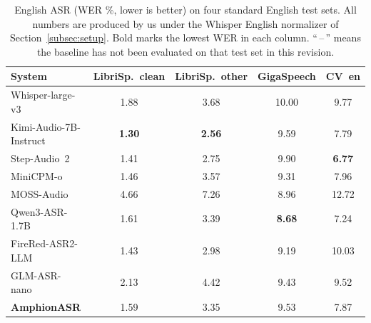 \begin{table}[t]
  \caption{English ASR (WER \%, lower is better) on four standard
    English test sets. All numbers are produced by us under the
    Whisper English normalizer of Section~\ref{subsec:setup}. Bold
    marks the lowest WER in each column. ``\,--\,'' means the
    baseline has not been evaluated on that test set in this
    revision.}
  \label{tab:asr_en}
  \centering
  \small
  \begin{tabular}{lcccc}
    \toprule
    System & LibriSp.~clean & LibriSp.~other & GigaSpeech & CV~en \\
    \midrule
    Whisper-large-v3~\cite{radford2023whisper} & 1.88 & 3.68 & 10.00 & 9.77 \\
    Kimi-Audio-7B-Instruct~\cite{kimiaudio2025} & \textbf{1.30} & \textbf{2.56} & 9.59 & 7.79 \\
    Step-Audio~2~\cite{stepaudio22025} & 1.41 & 2.75 & 9.90 & \textbf{6.77} \\
    MiniCPM-o~\cite{minicpm2025} & 1.46 & 3.57 & 9.31 & 7.96 \\
    MOSS-Audio~\cite{moss2026audio} & 4.66 & 7.26 & 8.96 & 12.72 \\
    Qwen3-ASR-1.7B~\cite{qwen2025qwen3asr} & 1.61 & 3.39 & \textbf{8.68} & 7.24 \\
    FireRed-ASR2-LLM~\cite{fireredasr2025} & 1.43 & 2.98 & 9.19 & 10.03 \\
    GLM-ASR-nano~\cite{glmasr2025} & 2.13 & 4.42 & 9.43 & 9.52 \\
    \midrule
    \textbf{AmphionASR} & 1.59 & 3.35 & 9.53 & 7.87 \\
    \bottomrule
  \end{tabular}
\end{table}
